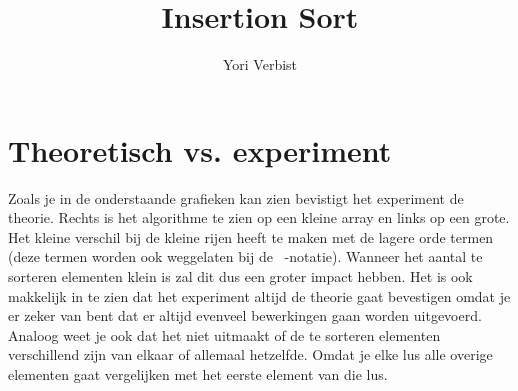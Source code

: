 \documentclass[]{article}
\title{\vspace{-3.0cm}Insertion Sort}
\author{Yori Verbist}
\begin{document}
\maketitle

\section{Theoretisch vs. experiment}
Zoals je in de onderstaande grafieken kan zien bevistigt het experiment de theorie. Rechts is het algorithme te zien op een kleine array en links op een grote. Het kleine verschil bij de kleine rijen heeft te maken met de lagere orde termen (deze termen worden ook weggelaten bij de ~-notatie). Wanneer het aantal te sorteren elementen klein is zal dit dus een groter impact hebben. \newline
Het is ook makkelijk in te zien dat het experiment altijd de theorie gaat bevestigen omdat je er zeker van bent dat er altijd evenveel bewerkingen gaan worden uitgevoerd. Analoog weet je ook dat het niet uitmaakt of de te sorteren elementen verschillend zijn van elkaar of allemaal hetzelfde. Omdat je elke lus alle overige elementen gaat vergelijken met het eerste element van die lus.
\end{document}
